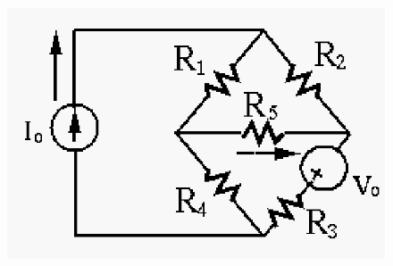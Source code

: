 \documentclass[11pt]{article}
\newcommand{\comments}[1]{}
\begin{document}
\begin{enumerate}
\begin{figure}[h!]
\centering
\includegraphics[scale=0.6]{midterm1f.eps}
\end{figure}

\comments{
{\bf Solution:} Use superposition. First consider the current source $I_0$ 
only with $V_0=0$ (short-circuit). Convert the delta composed of the top three 
resistors ($R_1$, $R_2$ and $R_5$) to Y:
\[
R_a=\frac{2\times 4}{2+6+4}=\frac{2}{3},\;\;\;\;
R_b=\frac{2\times 6}{2+6+4}=1,\;\;\;\;R_c=\frac{4\times 6}{2+6+4}=2 
\]
where $R_a$ is in series with $I_0$, and $R_b$ and $R_c$ are in series with 
$R_4$ and $R_3$, respectively. Treating the two branches as two voltage dividers,
we find the voltage across $R_5$ is zero and therefore $I'=0$,

Next consider the voltage source $V_0$ only, with $I_0=0$ (open-circuit).
The total resistance of the loop is 
\[
R_3+R_4+R_5//(R1+R_2)=8+4+6//(2+4)=15\Omega
\]
and the total current is 
\[
I_{total}=\frac{5V}{15\Omega}=\frac{1}{3}\;A
\]
and the current through $R_5$ can be found by current divider to be 
\[
I''=I_{total}=\frac{1}{3}\frac{R_1+R_2}{R_5+R_1+R_2}=\frac{1}{6}\;A
\]
The current due to both $I_0$ and $V_0$ is therefore $I=I'+I''=1/6\;A$.

Alternatively, we use Thevenin's model:
\begin{itemize}
\item Find $R_T$
  \[
  R_T=(R_1+R_2)//(R_3+R_4)=6//12=72/18=4
  \]
\item Find $V_T$ (+ on right) by superposition:
  $V'_T$ due to $V_0$ alone:
  \[
  V'_T=V_0\frac{R_1+R_2}{R_1+R_2+R_3+R_4}=5\frac{6}{18}=\frac{5}{3}
  \]
  $V''_T=0$ due to $I_0$ alone, because $R1/R_4=R_2/R_3$
\item 
  \[
  I=\frac{V_T}{R_T+R_5}=\frac{5}{3}\frac{1}{4+6}=\frac{1}{6}
  \]
\end{itemize}
}

\end{enumerate}
\end{document}
